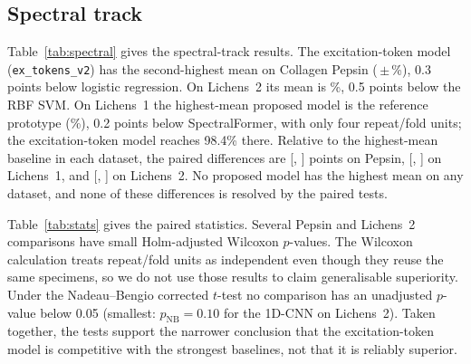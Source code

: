 \documentclass[journal]{IEEEtran}
\begin{document}
\subsection{Spectral track}
\begin{table}[!t]
\centering
\caption{Spectral track: balanced accuracy (\%), mean $\pm$ std over (repeat, fold) units. Best per column in bold, second best underlined. Models below the rule are our attention family (ex tokens v2: excitation tokens; ME-Attn (meas.): measurement tokens; SmartAttn v0: reference prototype). The $\Delta$ row compares the highest-mean proposed variant with the highest-mean baseline on the same outer-test units. Both are identified post hoc, so this row is descriptive.}
\label{tab:spectral}

\end{table}

Table~\ref{tab:spectral} gives the spectral-track results. The excitation-token model (\texttt{ex\_tokens\_v2}) has the second-highest mean on Collagen Pepsin (\BestOursAccPepsinSpectral\,$\pm$\,\BestOursStdPepsinSpectral\%), 0.3 points below logistic regression. On Lichens~2 its mean is \BestOursAccLichensTwoSpectral\%, 0.5 points below the RBF SVM. On Lichens~1 the highest-mean proposed model is the reference prototype (\BestOursAccLichensOneSpectral\%), 0.2 points below SpectralFormer, with only four repeat/fold units; the excitation-token model reaches 98.4\% there. Relative to the highest-mean baseline in each dataset, the paired differences are \GapPepsinSpectral{} [\GapLoPepsinSpectral, \GapHiPepsinSpectral] points on Pepsin, \GapLichensOneSpectral{} [\GapLoLichensOneSpectral, \GapHiLichensOneSpectral] on Lichens~1, and \GapLichensTwoSpectral{} [\GapLoLichensTwoSpectral, \GapHiLichensTwoSpectral] on Lichens~2. No proposed model has the highest mean on any dataset, and none of these differences is resolved by the paired tests.

Table~\ref{tab:stats} gives the paired statistics. Several Pepsin and Lichens~2 comparisons have small Holm-adjusted Wilcoxon $p$-values. The Wilcoxon calculation treats repeat/fold units as independent even though they reuse the same specimens, so we do not use those results to claim generalisable superiority. Under the Nadeau--Bengio corrected $t$-test no comparison has an unadjusted $p$-value below 0.05 (smallest: $p_{\mathrm{NB}}=0.10$ for the 1D-CNN on Lichens~2). Taken together, the tests support the narrower conclusion that the excitation-token model is competitive with the strongest baselines, not that it is reliably superior.
\end{document}

